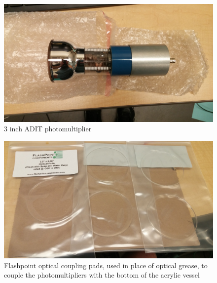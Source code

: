 \documentclass[]{article}
\begin{document}
\begin{figure}
  \includegraphics[width=\textwidth]{adit_pmt.jpg}
  \caption{3 inch ADIT photomultiplier}
\end{figure}
\begin{figure}
  \includegraphics[width=\textwidth]{optical_pads.jpg}
  \caption{Flashpoint optical coupling pads, used in place of optical grease,
  to couple the photomultipliers with the bottom of the acrylic vessel}
\end{figure}
\end{document}
